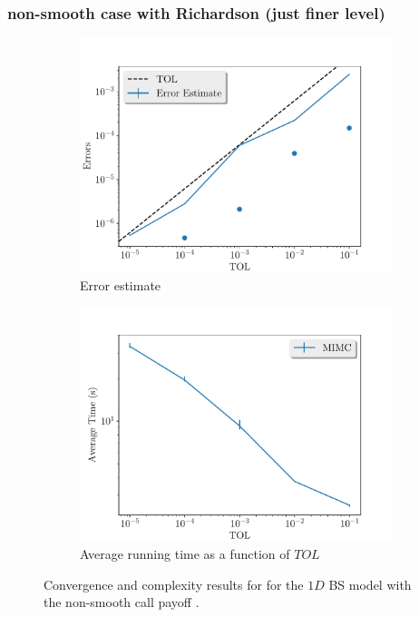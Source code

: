 \documentclass[11pt]{article}
\begin{document}
\subsubsection*{non-smooth case with Richardson (just finer level)}


\begin{figure}[!h]
	\centering
	\begin{subfigure}{.5\textwidth}
		\centering
		\includegraphics[width=1\linewidth]{./figures/1D_BS_4_steps_non_smooth_richardson_finer/error_estimate.pdf}
		\caption{Error estimate}
		\label{fig:misc_1D_BS_non_smooth_4steps_sub1}
	\end{subfigure}%
	\begin{subfigure}{.5\textwidth}
		\centering
		\includegraphics[width=1\linewidth]{./figures/1D_BS_4_steps_non_smooth_richardson_finer/average_running_time.pdf}
		\caption{Average running time as a function of $TOL$}
		\label{fig:misc_1D_BS_non_smooth_4steps_sub2}
	\end{subfigure}%
	\caption{Convergence and complexity results for for the $1D$ BS model with the non-smooth call payoff .}
	\label{fig:misc_1D_BS_nonsmooth_4steps_2}
\end{figure}
\end{document}
